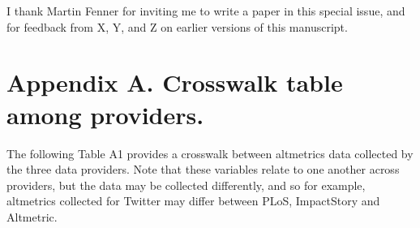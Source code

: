 \documentclass[letterpaper,superscriptaddress,showkeys,longbibliography]{revtex4-1}\usepackage{graphicx, color}
\begin{document}
I thank Martin Fenner for inviting me to write a paper in this special issue, and for feedback from X, Y, and Z on earlier versions of this manuscript.



\section{Appendix A. Crosswalk table among providers.}

The following Table A1 provides a crosswalk between altmetrics data collected by the three data providers. Note that these variables relate to one another across providers, but the data may be collected differently, and so for example, altmetrics collected for Twitter may differ between PLoS, ImpactStory and Altmetric.  
\end{document}
